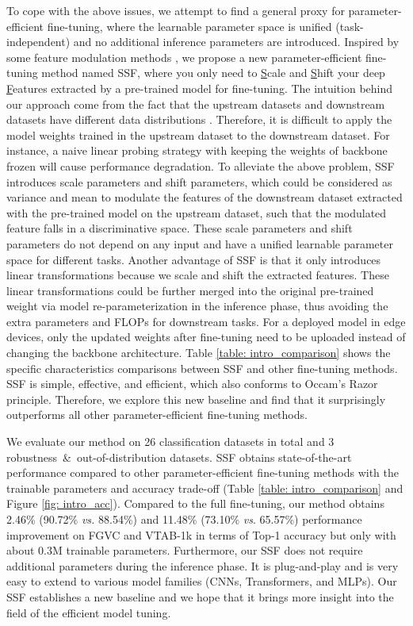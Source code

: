 To cope with the above issues, we attempt to find a general proxy for parameter-efficient fine-tuning, where the learnable parameter space is unified (task-independent) and no additional inference parameters are introduced. Inspired by some feature modulation methods \cite{wu2018group, huang2017arbitrary, perez2018film}, we propose a new parameter-efficient fine-tuning method named SSF, where you only need to \underline{S}cale and \underline{S}hift your deep \underline{F}eatures extracted by a pre-trained model for fine-tuning. The intuition behind our approach come from the fact that the upstream datasets and downstream datasets have different data distributions \cite{sun2016return}. Therefore, it is difficult to apply the model weights trained in the upstream dataset to the downstream dataset. For instance, a naive linear probing strategy with keeping the weights of backbone frozen will cause performance degradation. To alleviate the above problem, SSF introduces scale parameters and shift parameters, which could be considered as variance and mean to modulate the features of the downstream dataset extracted with the pre-trained model on the upstream dataset, such that the modulated feature falls in a discriminative space. These scale parameters and shift parameters do not depend on any input and have a unified learnable parameter space for different tasks. Another advantage of SSF is that it only introduces linear transformations because we scale and shift the extracted features. These linear transformations could be further merged into the original pre-trained weight via model re-parameterization \cite{ding2021repvgg} in the inference phase, thus avoiding the extra parameters and FLOPs for downstream tasks. For a deployed model in edge devices, only the updated weights after fine-tuning need to be uploaded instead of changing the backbone architecture. Table \ref{table: intro_comparison} shows the specific characteristics comparisons between SSF and other fine-tuning methods. SSF is simple, effective, and efficient, which also conforms to Occam's Razor principle. Therefore, we explore this new baseline and find that it surprisingly outperforms all other parameter-efficient fine-tuning methods.

We evaluate our method on 26 classification datasets in total and 3 robustness~\&~out-of-distribution datasets. SSF obtains state-of-the-art performance compared to other parameter-efficient fine-tuning methods with the trainable parameters and accuracy trade-off (Table \ref{table: intro_comparison} and Figure \ref{fig: intro_acc}). Compared to the full fine-tuning, our method obtains 2.46\% (90.72\% \emph{vs.} 88.54\%) and 11.48\% (73.10\% \emph{vs}. 65.57\%) performance improvement on FGVC and VTAB-1k in terms of Top-1 accuracy but only with about 0.3M trainable parameters. Furthermore, our SSF does not require additional parameters during the inference phase. It is plug-and-play and is very easy to extend to various model families (CNNs, Transformers, and MLPs). Our SSF establishes a new baseline and we hope that it brings more insight into the field of the efficient model tuning.

